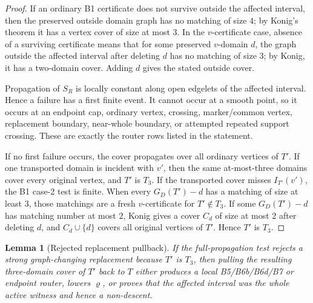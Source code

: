 \documentclass[11pt]{amsart}
\newtheorem{lemma}[theorem]{Lemma}
\theoremstyle{definition}
\begin{document}
\begin{proof}
If an ordinary B1 certificate does not survive outside the affected interval, then the preserved outside domain graph has no matching of size \(4\); by Konig's theorem it has a vertex cover of size at most \(3\). In the \(v\)-certificate case, absence of a surviving certificate means that for some preserved \(v\)-domain \(d\), the graph outside the affected interval after deleting \(d\) has no matching of size \(3\); by Konig, it has a two-domain cover. Adding \(d\) gives the stated outside cover.

Propagation of \(S_R\) is locally constant along open edgelets of the affected interval. Hence a failure has a first finite event. It cannot occur at a smooth point, so it occurs at an endpoint cap, ordinary vertex, crossing, marker/common vertex, replacement boundary, near-whole boundary, or attempted repeated support crossing. These are exactly the router rows listed in the statement.

If no first failure occurs, the cover propagates over all ordinary vertices of \(T'\). If one transported domain is incident with \(v'\), then the same at-most-three domains cover every original vertex, and \(T'\) is \(T_3\). If the transported cover misses \(I_{T'}(v')\), the B1 case-2 test is finite. When every \(G_D(T')-d\) has a matching of size at least \(3\), those matchings are a fresh \(v\)-certificate for \(T'\notin T_3\). If some \(G_D(T')-d\) has matching number at most \(2\), Konig gives a cover \(C_d\) of size at most \(2\) after deleting \(d\), and \(C_d\cup\{d\}\) covers all original vertices of \(T'\). Hence \(T'\) is \(T_3\).

\end{proof}
\begin{lemma}[Rejected replacement pullback]
If the full-propagation test rejects a strong graph-changing replacement because \(T'\) is \(T_3\), then pulling the resulting three-domain cover of \(T'\) back to \(T\) either produces a local B5/B6b/B6d/B7 or endpoint router, lowers \(\varrho\), or proves that the affected interval was the whole active witness and hence a non-descent.

\end{lemma}
\end{document}
